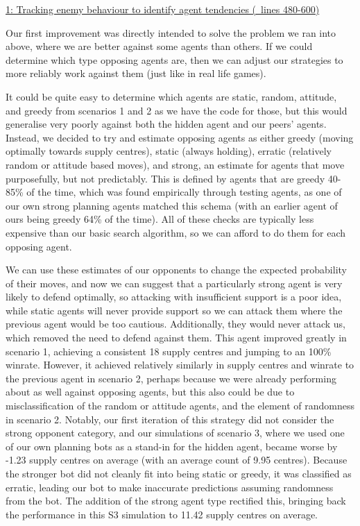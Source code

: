\documentclass[12pt,a4paper]{article}
\begin{document}
\underline{1: Tracking enemy behaviour to identify agent tendencies (~lines 480-600)}

Our first improvement was directly intended to solve the problem we ran into above, where we are better against some agents than others. If we could determine which type opposing agents are, then we can adjust our strategies to 
more reliably work against them (just like in real life games). 

It could be quite easy to determine which agents are static, random, attitude, and greedy from scenarios 1 and 2 as we have the code for those, but this would generalise very poorly against both the hidden agent and our peers' agents. 
Instead, we decided to try and estimate opposing agents as either greedy (moving optimally towards supply centres), static (always holding), erratic (relatively random or attitude based moves), and strong, an estimate for agents that move
purposefully, but not predictably. This is defined by agents that are greedy 40-85\% of the time, which was found empirically through testing agents, as one of our own strong planning agents matched this schema (with an earlier agent of ours
being greedy 64\% of the time).
All of these checks are typically less expensive than our basic search algorithm, so we can afford to do them for each opposing agent. 

We can use these estimates of our opponents to change the expected probability of their moves, and now we can suggest that a particularly strong agent is very likely to defend optimally, so attacking with insufficient support is a poor idea, 
while static agents will never provide support so we can attack them where the previous agent would be too cautious. Additionally, they would never attack us, which removed the need to defend against them. 
This agent improved greatly in scenario 1, achieving a consistent 18 supply centres and jumping to an 100\% winrate. However, it achieved relatively similarly in supply centres and winrate to the previous agent in scenario 2, 
perhaps because we were already performing about as well against opposing agents, but this also could be due to misclassification of the random or attitude agents, and the element of randomness in scenario 2.
Notably, our first iteration of this strategy did not consider the strong opponent category, and our simulations of scenario 3, where we used one of our own planning bots as a stand-in for the hidden agent, became worse by -1.23 supply centres
on average (with an average count of 9.95 centres). Because the stronger bot did not cleanly fit into being static or greedy, it was classified as erratic, leading our bot to make inaccurate predictions assuming randomness from the bot. The addition of the strong agent type rectified this, bringing back the performance in this S3 simulation to 11.42 supply centres on average.
\end{document}
